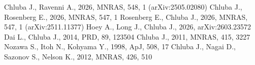 \documentclass[useAMS,usenatbib]{article}
\begin{document}
\begin{thebibliography}{}
 Chluba J., Ravenni A., 2026, MNRAS, 548, 1 (arXiv:2505.02080)
 Chluba J., Rosenberg E., 2026, MNRAS, 547, 1
 Rosenberg E., Chluba J., 2026, MNRAS, 547, 1 (arXiv:2511.11377)
 Hoey A., Long J., Chluba J., 2026, arXiv:2603.23572
 Dai L., Chluba J., 2014, PRD, 89, 123504
 Chluba J., 2011, MNRAS, 415, 3227
 Nozawa S., Itoh N., Kohyama Y., 1998, ApJ, 508, 17
 Chluba J., Nagai D., Sazonov S., Nelson K., 2012, MNRAS, 426, 510
\end{thebibliography}
\end{document}
